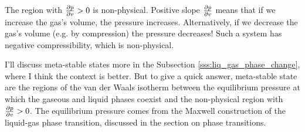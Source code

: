 \documentclass[11pt, a4paper]{article}
\begin{document}
\begin{itemize}
	The region with $ \pdv{p}{v} > 0 $ is non-physical. Positive slope $ \pdv{p}{v} $ means that if we increase the gas's volume, the pressure increases. Alternatively, if we decrease the gas's volume (e.g. by compression) the pressure decreases! Such a system has negative compressibility, which is non-physical. 
	
	I'll discuss meta-stable states more in the Subsection \ref{sss:liq_gas_phase_change}, where I think the context is better. But to give a quick answer, meta-stable state are the regions of the van der Waals isotherm between the equilibrium pressure at which the gaseous and liquid phases coexist and the non-physical region with $ \pdv{p}{v} > 0 $. The equilibrium pressure comes from the Maxwell construction of the liquid-gas phase transition, discussed in the section on phase transitions.

\end{itemize}
\fi
\end{document}
